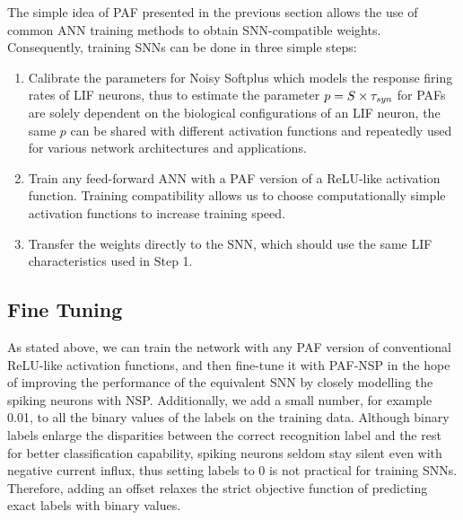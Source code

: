 	The simple idea of PAF presented in the previous section allows the use of common ANN training methods to obtain SNN-compatible weights.
	Consequently, training SNNs can be done in three simple steps: 
	\begin{enumerate}
		\item Calibrate the parameters \DIFdelbegin {}\DIFdelend \DIFaddbegin {}\DIFaddend for Noisy Softplus which models the response firing rates of LIF neurons, thus to estimate the parameter $p=S \times \tau_{\textit{\textrm{syn}}}$ for PAFs \DIFdelbegin {}\DIFdelend \DIFaddbegin {}\DIFaddend are solely dependent on the biological configurations of an LIF neuron, the same $p$ can be shared with different activation functions and repeatedly used for various network architectures and applications.
		\item Train any feed-forward ANN with a PAF version of a ReLU-like activation function.
		Training compatibility allows us to choose computationally simple activation functions to increase training speed.
		\DIFaddbegin 

		\DIFaddend %
		\item Transfer the \DIFaddbegin {}\DIFaddend weights directly to the SNN, which should use the same LIF characteristics used in Step 1.
	\end{enumerate}

	\subsection{Fine Tuning}
	\label{subsec:finetune}
	As stated above, we can train the network with any PAF version of conventional ReLU-like activation functions, and then fine-tune it with PAF-NSP in the hope of improving the performance of the equivalent SNN by closely modelling the spiking neurons with NSP.
	Additionally, we add a small number, for example 0.01, to all the binary values of the labels on the training data.
	Although binary labels enlarge the disparities between the correct recognition label and the rest for better classification capability, 
	spiking neurons seldom stay silent even with negative current influx, thus setting labels to 0 is not practical for training SNNs.
	Therefore, adding an offset relaxes the strict objective function of predicting exact labels with binary values.

